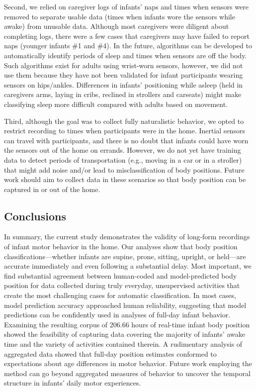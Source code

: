 \documentclass[
  man]{apa6}
\begin{document}
Second, we relied on caregiver logs of infants' naps and times when sensors were removed to separate usable data (times when infants wore the sensors while awake) from unusable data. Although most caregivers were diligent about completing logs, there were a few cases that caregivers may have failed to report naps (younger infants \#1 and \#4). In the future, algorithms can be developed to automatically identify periods of sleep and times when sensors are off the body. Such algorithms exist for adults using wrist-worn sensors, however, we did not use them because they have not been validated for infant participants wearing sensors on hips/ankles. Differences in infants' positioning while asleep (held in caregivers arms, laying in cribs, reclined in strollers and carseats) might make classifying sleep more difficult compared with adults based on movement.

Third, although the goal was to collect fully naturalistic behavior, we opted to restrict recording to times when participants were in the home. Inertial sensors can travel with participants, and there is no doubt that infants could have worn the sensors out of the home on errands. However, we do not yet have training data to detect periods of transportation (e.g., moving in a car or in a stroller) that might add noise and/or lead to misclassification of body positions. Future work should aim to collect data in these scenarios so that body position can be captured in or out of the home.

\hypertarget{conclusions}{%
\subsection{Conclusions}\label{conclusions}}

In summary, the current study demonstrates the validity of long-form recordings of infant motor behavior in the home. Our analyses show that body position classifications---whether infants are supine, prone, sitting, upright, or held---are accurate immediately and even following a substantial delay. Most important, we find substantial agreement between human-coded and model-predicted body position for data collected during truly everyday, unsupervised activities that create the most challenging cases for automatic classification. In most cases, model prediction accuracy approached human reliability, suggesting that model predictions can be confidently used in analyses of full-day infant behavior. Examining the resulting corpus of 206.66 hours of real-time infant body position showed the feasibility of capturing data covering the majority of infants' awake time and the variety of activities contained therein. A rudimentary analysis of aggregated data showed that full-day position estimates conformed to expectations about age differences in motor behavior. Future work employing the method can go beyond aggregated measures of behavior to uncover the temporal structure in infants' daily motor experiences.
\end{document}
